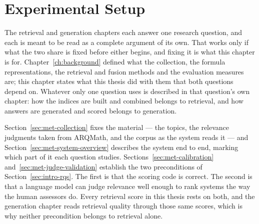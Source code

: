\chapter{Experimental Setup}\label{ch:setup}


The retrieval and generation chapters each answer one research
question, and each is meant to be read as a complete argument of its own. That
works only if what the two share is fixed before either begins, and fixing it is
what this chapter is for. Chapter~\ref{ch:background} defined what the
collection, the formula representations, the retrieval and fusion methods and the
evaluation measures are; this chapter states what this thesis did with them that
both questions depend on. Whatever only one question uses is described in that
question's own chapter: how the indices are built and combined belongs to
retrieval, and how answers are generated and scored belongs to generation.

Section~\ref{sec:met-collection} fixes the material --- the topics, the relevance
judgments taken from ARQMath, and the corpus as the system reads it --- and
Section~\ref{sec:met-system-overview} describes the system end to end, marking
which part of it each question studies. Sections~\ref{sec:met-calibration}
and~\ref{sec:met-judge-validation} establish the two
preconditions of Section~\ref{sec:intro-rqs}. The first is that the scoring code
is correct. The second is that a language model can judge relevance well enough to
rank systems the way the human assessors do. Every retrieval score in this thesis
rests on both, and the generation chapter reads retrieval quality through
those same scores, which is why neither precondition belongs to retrieval alone.

